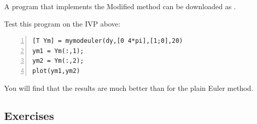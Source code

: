 A program that implements the Modified method can be downloaded as
.

%
Test this program on the IVP above:
\begin{lstlisting}[frame=none,numbers=left]
[T Ym] = mymodeuler(dy,[0 4*pi],[1;0],20)
ym1 = Ym(:,1);
ym2 = Ym(:,2);
plot(ym1,ym2)
\end{lstlisting}
You will find that the results are much better than for the plain Euler method.




\subsection*{Exercises}


